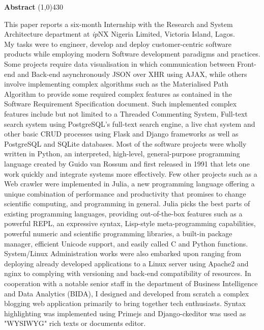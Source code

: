 \begin{center}
	{\huge \bf Abstract}
	\line(1,0){430}
\end{center}

This paper reports a six-month Internship with the Research and System Architecture department at \textit{ip}NX Nigeria Limited, Victoria Island, Lagos.\\ 

My tasks were to engineer, develop and deploy customer-centric software products while employing modern Software development paradigms and practices. Some projects require data visualisation in which communication between Front-end and Back-end asynchronously JSON over XHR using AJAX, while others involve implementing complex algorithms such as the Materialised Path Algorithm to provide some required complex features as contained in the Software Requirement Specification document. Such implemented complex features include but not limited to a Threaded Commenting System, Full-text search system using PostgreSQL's full-text search engine, a live chat system and other basic \ac{CRUD} processes using Flask and Django frameworks as well as PostgreSQL and SQLite databases. Most of the software projects were wholly written in Python, an interpreted, high-level, general-purpose programming language created by Guido van Rossum and first released in 1991 that lets one work quickly and integrate systems more effectively. Few other projects such as a Web crawler were implemented in Julia, a new programming language offering a unique combination of performance and productivity that promises to change scientific computing, and programming in general.
Julia picks the best parts of existing programming languages, providing out-of-the-box features such as a powerful \ac{REPL}, an expressive syntax, Lisp-style meta-programming capabilities, powerful numeric and scientific programming libraries, a built-in package manager, efficient Unicode support, and easily called C and Python functions.\\

System/Linux Administration works were also embarked upon ranging from deploying already developed applications to a Linux server using Apache2 and nginx to complying with versioning and back-end compatibility of resources. In cooperation with a notable senior staff in the department of Business Intelligence and Data Analytics (BIDA), I designed and developed from scratch a complex blogging web application  primarily to bring together tech enthusiasts.  Syntax highlighting was implemented using Primejs and Django-ckeditor was used as "\ac{WYSIWYG}" rich texts or documents editor.
\clearpage